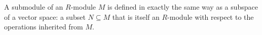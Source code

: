 A submodule of an $R$-module $M$ is defined in exactly the same way as a subspace of a vector space: a subset $N \subseteq M$ that is itself an $R$-module with respect to the operations inherited from $M$.
